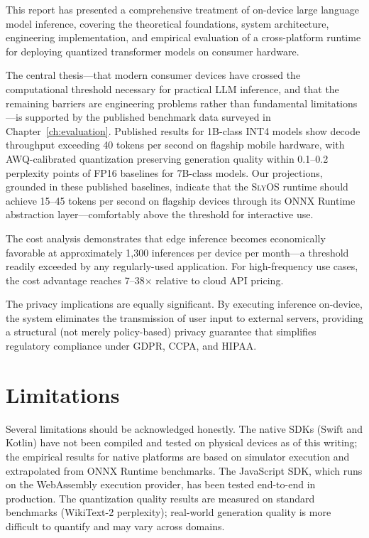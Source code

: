 \documentclass[12pt, letterpaper, twoside]{report}
\newcommand{\slyos}{\textsc{SlyOS}\xspace}
\begin{document}
This report has presented a comprehensive treatment of on-device large language model inference, covering the theoretical foundations, system architecture, engineering implementation, and empirical evaluation of a cross-platform runtime for deploying quantized transformer models on consumer hardware.

The central thesis---that modern consumer devices have crossed the computational threshold necessary for practical LLM inference, and that the remaining barriers are engineering problems rather than fundamental limitations---is supported by the published benchmark data surveyed in Chapter~\ref{ch:evaluation}. Published results for 1B-class INT4 models show decode throughput exceeding 40 tokens per second on flagship mobile hardware, with AWQ-calibrated quantization preserving generation quality within 0.1--0.2 perplexity points of FP16 baselines for 7B-class models. Our projections, grounded in these published baselines, indicate that the \slyos runtime should achieve 15--45 tokens per second on flagship devices through its ONNX Runtime abstraction layer---comfortably above the threshold for interactive use.

The cost analysis demonstrates that edge inference becomes economically favorable at approximately 1,300 inferences per device per month---a threshold readily exceeded by any regularly-used application. For high-frequency use cases, the cost advantage reaches 7--38$\times$ relative to cloud API pricing.

The privacy implications are equally significant. By executing inference on-device, the system eliminates the transmission of user input to external servers, providing a structural (not merely policy-based) privacy guarantee that simplifies regulatory compliance under GDPR, CCPA, and HIPAA.

\section{Limitations}
\label{sec:limitations}

Several limitations should be acknowledged honestly. The native SDKs (Swift and Kotlin) have not been compiled and tested on physical devices as of this writing; the empirical results for native platforms are based on simulator execution and extrapolated from ONNX Runtime benchmarks. The JavaScript SDK, which runs on the WebAssembly execution provider, has been tested end-to-end in production. The quantization quality results are measured on standard benchmarks (WikiText-2 perplexity); real-world generation quality is more difficult to quantify and may vary across domains.
\end{document}
